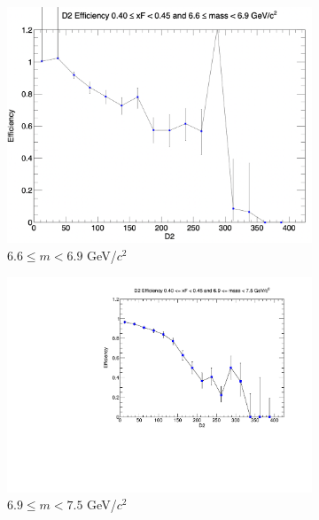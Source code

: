 \begin{figure}[p]
\begin{subfigure}[b]{0.32\textwidth}
        \includegraphics[width=\textwidth]{./kTrackerEfficiencyPlots/D2_Efficiency_xF8_mass8.png}
        \caption{$6.6 \leq m < 6.9$ GeV/$c^2$}
        \label{fig:xF8_mass8}
    \end{subfigure}
    \vspace{0.5cm}
    \begin{subfigure}[b]{0.32\textwidth}
        \centering
        \includegraphics[width=\textwidth]{./kTrackerEfficiencyPlots/D2_Efficiency_xF8_mass9.pdf}
        \caption{$6.9 \leq m < 7.5$ GeV/$c^2$}
        \label{fig:xF8_mass9}
    \end{subfigure}
    \hfill
    \begin{subfigure}[b]{0.32\textwidth}
        \centering

\end{subfigure}
\end{figure}
